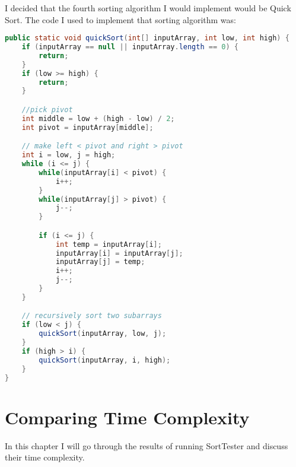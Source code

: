 \documentclass{report}
\begin{document}
I decided that the fourth sorting algorithm I would implement would be Quick Sort. The code I used to implement that sorting algorithm was:

\begin{lstlisting}[language=java, caption=Quicksort implementation]
public static void quickSort(int[] inputArray, int low, int high) {
    if (inputArray == null || inputArray.length == 0) {
        return;
    }
    if (low >= high) {
        return;
    }

    //pick pivot
    int middle = low + (high - low) / 2;
    int pivot = inputArray[middle];

    // make left < pivot and right > pivot
    int i = low, j = high;
    while (i <= j) {
        while(inputArray[i] < pivot) {
            i++;
        }
        while(inputArray[j] > pivot) {
            j--;
        }

        if (i <= j) {
            int temp = inputArray[i];
            inputArray[i] = inputArray[j];
            inputArray[j] = temp;
            i++;
            j--;
        }
    }

    // recursively sort two subarrays
    if (low < j) {
        quickSort(inputArray, low, j);
    }
    if (high > i) {
        quickSort(inputArray, i, high);
    }
}
\end{lstlisting}

\chapter{Comparing Time Complexity}

In this chapter I will go through the results of running Sort\textunderscore Tester and discuss their time complexity.


\end{document}
